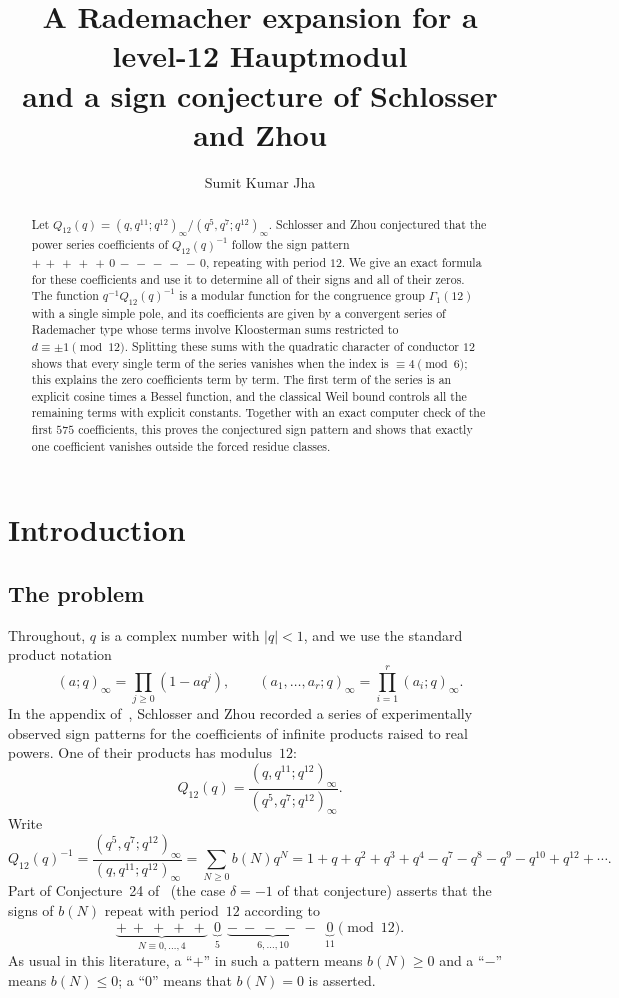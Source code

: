 \documentclass[11pt]{amsart}
\title[A Rademacher expansion for a level-12 Hauptmodul]{A Rademacher expansion for a level-12 Hauptmodul\\ and a sign conjecture of Schlosser and Zhou}
\author{Sumit Kumar Jha}
\numberwithin{equation}{section}
\theoremstyle{definition}
\theoremstyle{remark}
\begin{document}
\begin{abstract}
Let $Q_{12}(q)=(q,q^{11};q^{12})_\infty/(q^5,q^7;q^{12})_\infty$. Schlosser and Zhou conjectured that the power series coefficients of $Q_{12}(q)^{-1}$ follow the sign pattern $+\,+\,+\,+\,+\,0\,-\,-\,-\,-\,-\,0$, repeating with period $12$. We give an exact formula for these coefficients and use it to determine all of their signs and all of their zeros. The function $q^{-1}Q_{12}(q)^{-1}$ is a modular function for the congruence group $\Gamma_1(12)$ with a single simple pole, and its coefficients are given by a convergent series of Rademacher type whose terms involve Kloosterman sums restricted to $d\equiv\pm1\pmod{12}$. Splitting these sums with the quadratic character of conductor $12$ shows that every single term of the series vanishes when the index is $\equiv 4\pmod 6$; this explains the zero coefficients term by term. The first term of the series is an explicit cosine times a Bessel function, and the classical Weil bound controls all the remaining terms with explicit constants. Together with an exact computer check of the first $575$ coefficients, this proves the conjectured sign pattern and shows that exactly one coefficient vanishes outside the forced residue classes.
\end{abstract}

\maketitle

\section{Introduction}\label{sec:intro}

\subsection{The problem}
Throughout, $q$ is a complex number with $|q|<1$, and we use the standard product notation
\[
(a;q)_\infty=\prod_{j\ge 0}(1-aq^j),\qquad (a_1,\dots,a_r;q)_\infty=\prod_{i=1}^r(a_i;q)_\infty .
\]
In the appendix of~\cite{SZ}, Schlosser and Zhou recorded a series of experimentally observed sign patterns for the coefficients of infinite products raised to real powers. One of their products has modulus~$12$:
\begin{equation}\label{eq:Q12}
Q_{12}(q)=\frac{(q,q^{11};q^{12})_\infty}{(q^5,q^7;q^{12})_\infty}.
\end{equation}
Write
\begin{equation}\label{eq:b}
Q_{12}(q)^{-1}=\frac{(q^5,q^7;q^{12})_\infty}{(q,q^{11};q^{12})_\infty}=\sum_{N\ge0}b(N)q^N
=1+q+q^2+q^3+q^4-q^7-q^8-q^9-q^{10}+q^{12}+\cdots.
\end{equation}
Part of Conjecture~24 of~\cite{SZ} (the case $\delta=-1$ of that conjecture) asserts that the signs of $b(N)$ repeat with period~$12$ according to
\[
\underbrace{+\ +\ +\ +\ +}_{N\equiv 0,\dots,4}\ \ \underbrace{0}_{5}\ \ \underbrace{-\ -\ -\ -\ -}_{6,\dots,10}\ \ \underbrace{0}_{11}\pmod{12}.
\]
As usual in this literature, a ``$+$'' in such a pattern means $b(N)\ge0$ and a ``$-$'' means $b(N)\le0$; a ``$0$'' means that $b(N)=0$ is asserted.
\end{document}

